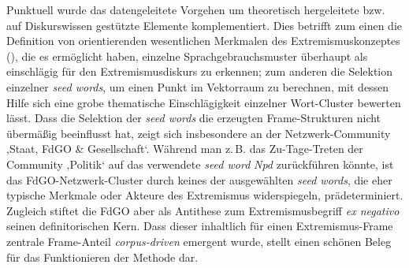 Punktuell wurde das datengeleitete Vorgehen um theoretisch hergeleitete bzw. auf Diskurswissen gestützte Elemente komplementiert. Dies betrifft zum einen die Definition von orientierenden wesentlichen Merkmalen des Extremismuskonzeptes (), die es ermöglicht haben, einzelne Sprachgebrauchsmuster überhaupt als einschlägig für den Extremismusdiskurs zu erkennen; zum anderen die Selektion einzelner \emph{seed words}, um einen Punkt im Vektorraum zu berechnen, mit dessen Hilfe sich eine grobe thematische Einschlägigkeit einzelner Wort-Cluster bewerten lässt. Dass die Selektion der \emph{seed words} die erzeugten Frame-Strukturen nicht übermäßig beeinflusst hat, zeigt sich insbesondere an der Netzwerk-Community ‚Staat, FdGO \& Gesellschaft`. Während man z.\,B. das Zu-Tage-Treten der Community ‚Politik` auf das verwendete \emph{seed word} \emph{Npd} zurückführen könnte, ist das FdGO-Netzwerk-Cluster durch keines der ausgewählten \emph{seed words}, die eher typische Merkmale oder Akteure des Extremismus widerspiegeln, prädeterminiert. Zugleich stiftet die FdGO aber als Antithese zum Extremismusbegriff \emph{ex negativo} seinen definitorischen Kern. Dass dieser inhaltlich für einen Extremismus-Frame zentrale Frame-Anteil \emph{corpus-driven} emergent wurde, stellt einen schönen Beleg für das Funktionieren der Methode dar.

